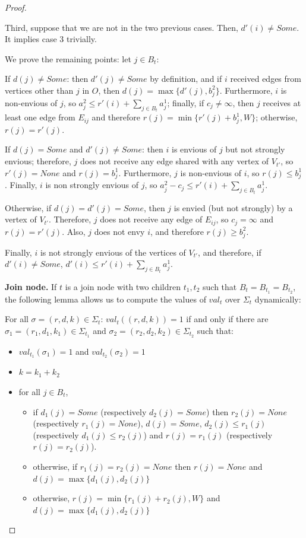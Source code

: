 \documentclass[11pt,letterpaper]{article}
\begin{document}
\begin{proof}
\begin{nestedproof}
        Third, suppose that we are not in the two previous cases. Then, $d'(i)\neq Some$. It implies case 3 trivially.

        We prove the remaining points: let $j\in B_t$:

        If $d(j)\neq Some$: then $d'(j)\neq Some$ by definition, and if $i$ received edges from vertices other than $j$ in $O$, then $d(j)=\max\{d'(j),b_j^2\}$. Furthermore, $i$ is non-envious of $j$, so $a_j^2\leq r'(i)+\sum_{j\in B_t}a_{j}^1$; finally, if $c_j\neq\infty$, then $j$ receives at least one edge from $E_{ij}$ and therefore $r(j)=\min\{r'(j)+b_j^1,W\}$; otherwise, $r(j)=r'(j)$.

        If $d(j)=Some$ and $d'(j)\neq Some$: then $i$ is envious of $j$ but not strongly envious; therefore, $j$ does not receive any edge shared with any vertex of $V_{t'}$, so $r'(j)=None$ and $r(j)=b_j^1$. Furthermore, $j$ is non-envious of $i$, so $r(j)\leq b_j^1$. Finally, $i$ is non strongly envious of $j$, so $a_j^2-c_j\leq r'(i)+\sum_{j\in B_t}a_{j}^1$.

        Otherwise, if $d(j)=d'(j)=Some$, then $j$ is envied (but not strongly) by a vertex of $V_{t'}$. Therefore, $j$ does not receive any edge of $E_{ij}$, so $c_j=\infty$ and $r(j)=r'(j)$. Also, $j$ does not envy $i$, and therefore $r(j)\geq b_j^2$.

        Finally, $i$ is not strongly envious of the vertices of $V_{t'}$, and therefore, if $d'(i)\neq Some$, $d'(i)\leq r'(i)+\sum_{j\in B_t}a_{j}^1$.

    \end{nestedproof}

    \textbf{Join node.} If $t$ is a join node with two children $t_1,t_2$ such that $B_t=B_{t_1}=B_{t_2}$, the following lemma allows us to compute the values of $val_t$ over $\Sigma_t$ dynamically:

    \begin{lemma}
        For all $\sigma=(r,d,k)\in \Sigma_t$: $val_t((r,d,k))=1$ if and only if there are $\sigma_1=(r_1,d_1,k_1)\in \Sigma_{t_1}$ and $\sigma_2=(r_2,d_2,k_2)\in \Sigma_{t_2}$ such that:

        \begin{itemize}
            \item $val_{t_1}(\sigma_1)=1$ and $val_{t_2}(\sigma_2)=1$
            \item $k=k_1+k_2$
            \item for all $j\in B_t$,
            \begin{itemize}
                \item if $d_1(j)=Some$ (respectively $d_2(j)=Some$) then $r_2(j)=None$ (respectively $r_1(j)=None$), $d(j)=Some$, $d_2(j)\leq r_1(j)$ (respectively $d_1(j)\leq r_2(j)$) and $r(j)=r_1(j)$ (respectively $r(j)=r_2(j)$).
                \item otherwise, if $r_1(j)=r_2(j)=None$ then $r(j)=None$ and $d(j)=\max\{d_1(j),d_2(j)\}$
                \item otherwise, $r(j)=\min\{r_1(j)+r_2(j),W\}$ and $d(j)=\max\{d_1(j),d_2(j)\}$
            \end{itemize}
        \end{itemize}


\end{lemma}
\end{proof}
\end{document}
